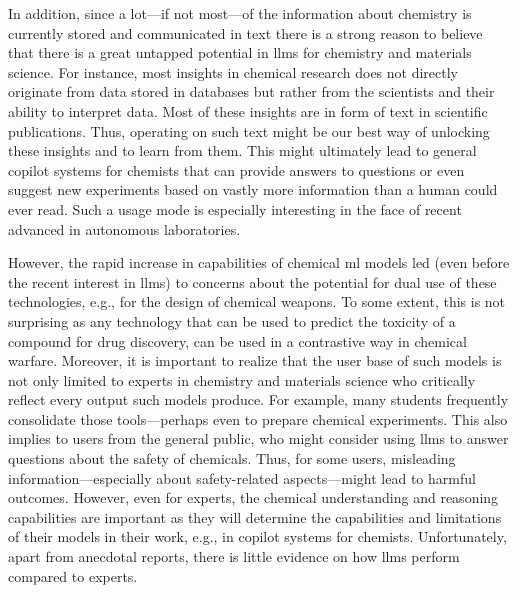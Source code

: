\documentclass[11pt, oneside]{article}
\begin{document}
\begin{refsection}
In addition, since a lot---if not most---of the information about chemistry is currently stored and communicated in text there is a strong reason to believe that there is a great untapped potential in \glspl{llm} for chemistry and materials science.
For instance, most insights in chemical research does not directly originate from data stored in databases but rather from the scientists and their ability to interpret data. 
Most of these insights are in form of text in scientific publications. 
Thus, operating on such text might be our best way of unlocking these insights and to learn from them.
This might ultimately lead to general copilot systems for chemists that can provide answers to questions or even suggest new experiments based on vastly more information than a human could ever read.
Such a usage mode is especially interesting in the face of recent advanced in autonomous laboratories.\autocite{Boiko_2023, bran2023chemcrow, darvish2024organa, granda2018controlling, Angello_2022, coley2019robotic, Burger_2020, seifrid2022autonomous}


However, the rapid increase in capabilities of chemical \gls{ml} models led (even before the recent interest in \glspl{llm}) to concerns about the potential for dual use of these technologies, e.g., for the design of chemical weapons.\autocite{gopal2023releasing, ganguli2022red, Urbina_2022, campbell2023censoring, moulange2023towards, urbina2022teachable}
To some extent, this is not surprising as any technology that can be used to predict the toxicity of a compound for drug discovery, can be used in a contrastive way in chemical warfare.
Moreover, it is important to realize that the user base of such models is not only limited to experts in chemistry and materials science who critically reflect every output such models produce. 
For example, many students frequently consolidate those tools---perhaps even to prepare chemical experiments.\autocite{Intelligent.com_2023}
This also implies to users from the general public, who might consider using \glspl{llm} to answer questions about the safety of chemicals.
Thus, for some users, misleading information---especially about safety-related aspects---might lead to harmful outcomes. 
However, even for experts, the chemical understanding and reasoning capabilities are important as they will determine the capabilities and limitations of their models in their work, e.g., in copilot systems for chemists.
Unfortunately, apart from anecdotal reports, there is little evidence on how \glspl{llm} perform compared to experts.


\end{refsection}
\end{document}
